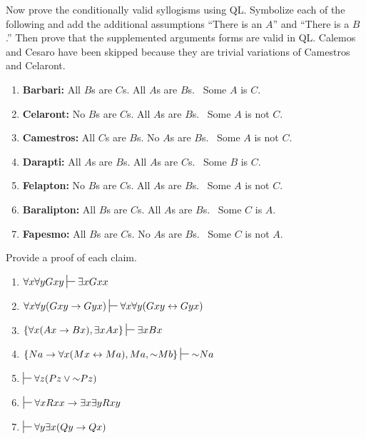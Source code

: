 \problempart
\label{pr.BarbaraEtc.proof2}
Now prove the conditionally valid syllogisms using QL. Symbolize each of the following and add the additional assumptions ``There is an $A$'' and ``There is a $B$.'' Then prove that the supplemented arguments forms are valid in QL. Calemos and Cesaro have been skipped because they are trivial variations of Camestros and Celaront. 

\begin{enumerate}[label=\arabic*), topsep=0pt, parsep=0pt, itemsep=3pt]

\item\textbf{Barbari:} All $B$s are $C$s. All $A$s are $B$s.
	\therefore\  Some $A$ is $C$.
\item\textbf{Celaront:} No $B$s are $C$s. All $A$s are $B$s.
	\therefore\  Some $A$ is not $C$.
\item\textbf{Camestros:} All $C$s are $B$s. No $A$s are $B$s.
	\therefore\  Some $A$ is not $C$.
\item\textbf{Darapti:} All $A$s are $B$s. All $A$s are $C$s.
	\therefore\  Some $B$ is $C$.
\item\textbf{Felapton:} No $B$s are $C$s. All $A$s are $B$s.
	\therefore\  Some $A$ is not $C$.
\item\textbf{Baralipton:} All $B$s are $C$s. All $A$s are $B$s.
	\therefore\  Some $C$ is $A$.
\item\textbf{Fapesmo:} All $B$s are $C$s. No $A$s are $B$s.
	\therefore\  Some $C$ is not $A$.
\end{enumerate}



\problempart
Provide a proof of each claim.
\begin{enumerate}[label=\arabic*), topsep=0pt, parsep=0pt, itemsep=3pt]
\item $\forall x \forall y Gxy \sststile{}{} \exists x Gxx$
\item $\forall x \forall y (Gxy \eif Gyx) \sststile{}{} \forall x\forall y (Gxy \eiff Gyx)$
\item $\{\forall x(Ax\eif Bx), \exists x Ax\} \sststile{}{} \exists x Bx$
\item $\{Na \eif \forall x(Mx \eiff Ma), Ma, \enot Mb\}\sststile{}{} \enot Na$
\item $\sststile{}{}\forall z (Pz \eor \enot Pz)$
\item $\sststile{}{}\forall x Rxx\eif \exists x \exists y Rxy$
\item $\sststile{}{}\forall y \exists x (Qy \eif Qx)$
\end{enumerate}

